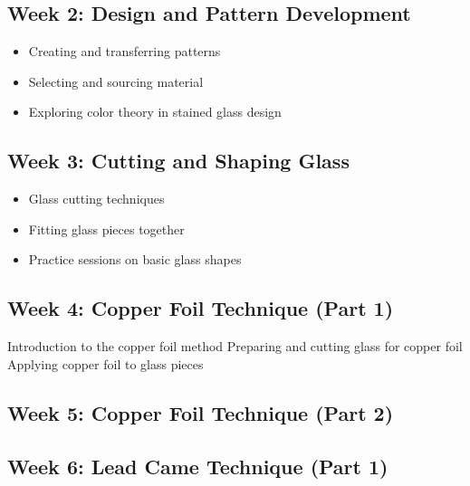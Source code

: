\documentclass[11pt]{article}
\begin{document}
    \subsection*{Week 2: Design and Pattern Development}
        \begin{itemize}
            \item Creating and transferring patterns
            \item Selecting and sourcing material
            \item Exploring color theory in stained glass design
        \end{itemize}

    \subsection*{Week 3: Cutting and Shaping Glass}
    \begin{itemize}
        \item Glass cutting techniques
        \item Fitting glass pieces together
        \item Practice sessions on basic glass shapes
    \end{itemize}

    \subsection*{Week 4: Copper Foil Technique (Part 1)}
    \begin{itemize}
        Introduction to the copper foil method
        Preparing and cutting glass for copper foil
        Applying copper foil to glass pieces

    \end{itemize}

    \subsection*{Week 5: Copper Foil Technique (Part 2)}
    \begin{itemize}

    \end{itemize}

    \subsection*{Week 6: Lead Came Technique (Part 1)}
    \begin{itemize}

    \end{itemize}
\end{document}
